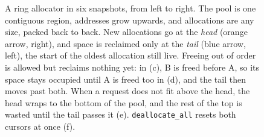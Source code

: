 \begin{figure}[tbp]
\caption{A ring allocator in six snapshots, from left to right. The pool
  is one contiguous region, addresses grow upwards, and allocations are
  any size, packed back to back. New allocations go at the \emph{head}
  (orange arrow, right), and space is reclaimed only at the \emph{tail}
  (blue arrow, left), the start of the oldest allocation still live.
  Freeing out of order is allowed but reclaims nothing yet: in (c), B is
  freed before A, so its space stays occupied until A is freed too in (d),
  and the tail then moves past both. When a request does not fit above the
  head, the head wraps to the bottom of the pool, and the rest of the top
  is wasted until the tail passes it (e). \texttt{deallocate\_all} resets
  both cursors at once (f).}
\label{fig:ring-alloc}
\end{figure}
